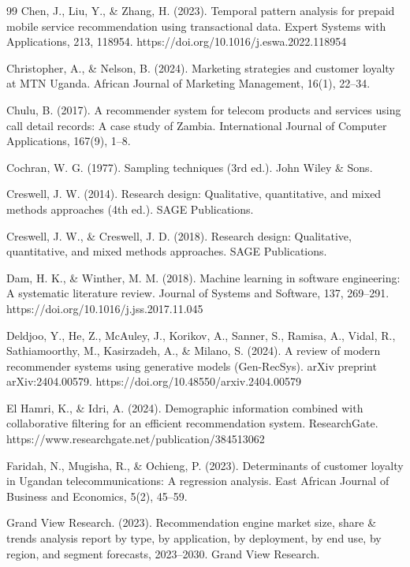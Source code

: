 \begin{thebibliography}{99}
Chen, J., Liu, Y., \& Zhang, H. (2023). Temporal pattern analysis for prepaid mobile service recommendation using transactional data. Expert Systems with Applications, 213, 118954. https://doi.org/10.1016/j.eswa.2022.118954

Christopher, A., \& Nelson, B. (2024). Marketing strategies and customer loyalty at MTN Uganda. African Journal of Marketing Management, 16(1), 22--34.

Chulu, B. (2017). A recommender system for telecom products and services using call detail records: A case study of Zambia. International Journal of Computer Applications, 167(9), 1--8.

Cochran, W. G. (1977). Sampling techniques (3rd ed.). John Wiley \& Sons.

Creswell, J. W. (2014). Research design: Qualitative, quantitative, and mixed methods approaches (4th ed.). SAGE Publications.

Creswell, J. W., \& Creswell, J. D. (2018). Research design: Qualitative, quantitative, and mixed methods approaches. SAGE Publications.

Dam, H. K., \& Winther, M. M. (2018). Machine learning in software engineering: A systematic literature review. Journal of Systems and Software, 137, 269--291. https://doi.org/10.1016/j.jss.2017.11.045

Deldjoo, Y., He, Z., McAuley, J., Korikov, A., Sanner, S., Ramisa, A., Vidal, R., Sathiamoorthy, M., Kasirzadeh, A., \& Milano, S. (2024). A review of modern recommender systems using generative models (Gen-RecSys). arXiv preprint arXiv:2404.00579. https://doi.org/10.48550/arxiv.2404.00579

El Hamri, K., \& Idri, A. (2024). Demographic information combined with collaborative filtering for an efficient recommendation system. ResearchGate. https://www.researchgate.net/publication/384513062

Faridah, N., Mugisha, R., \& Ochieng, P. (2023). Determinants of customer loyalty in Ugandan telecommunications: A regression analysis. East African Journal of Business and Economics, 5(2), 45--59.

Grand View Research. (2023). Recommendation engine market size, share \& trends analysis report by type, by application, by deployment, by end use, by region, and segment forecasts, 2023--2030. Grand View Research.


\end{thebibliography}
